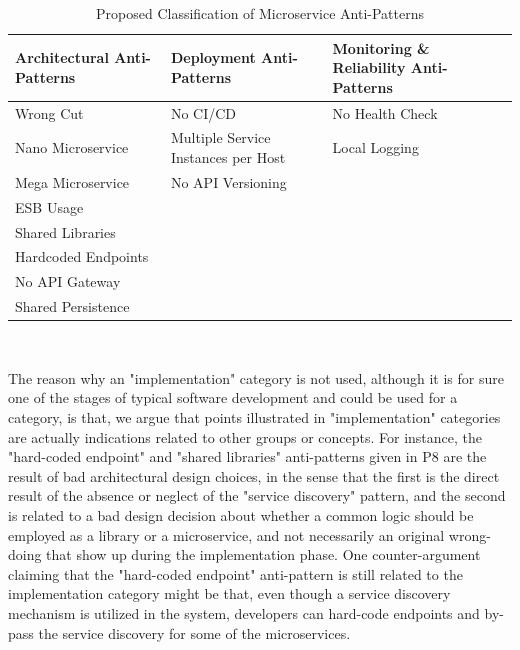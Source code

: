 \documentclass{Configuration_Files/PoliMi3i_thesis}
\begin{document}
\begin{table}[H]
\centering 
    \begin{tabular}{ 
  | >{\centering\arraybackslash} m{12em} 
  | >{\centering\arraybackslash} m{12em} 
  | >{\centering\arraybackslash} m{12em} | }
    \hline
    \rowcolor{bluepoli!40}
    \textbf{Architectural Anti-Patterns} & \textbf{Deployment Anti-Patterns} & \textbf{Monitoring \& Reliability Anti-Patterns}\T\B \\
    \hline \hline
    Wrong Cut & No CI/CD & No Health Check\T\B\\
    \hline
    \rowcolor{bluepoli!10}
    Nano Microservice & Multiple Service Instances per Host & Local Logging\T\B\\
    \hline
    Mega Microservice & No API Versioning & \T\B\\
    \hline
    \rowcolor{bluepoli!10}
    ESB Usage &  & \T\B\\
    \hline
    Shared Libraries &  & \T\B\\
    \hline
    \rowcolor{bluepoli!10}
    Hardcoded Endpoints & & \T\B\\
    \hline
    No API Gateway & & \T\B\\
    \hline
    \rowcolor{bluepoli!10}
    Shared Persistence & & \T\B\\
    \hline
    \end{tabular}
    \\[10pt]
    \caption{Proposed Classification of Microservice Anti-Patterns}
    \label{table:antipattern_table}
\end{table}
The reason why an "implementation" category is not used, although it is for sure one of the stages of typical software development and could be used for a category, is that, we argue that points illustrated in "implementation" categories are actually indications related to other groups or concepts.
For instance, the "hard-coded endpoint" and "shared libraries" anti-patterns given in P8 are the result of bad architectural design choices, in the sense that the first is the direct result of the absence or neglect of the "service discovery" pattern, and the second is related to a bad design decision about whether a common logic should be employed as a library or a microservice, and not necessarily an original wrong-doing that show up during the implementation phase.
One counter-argument claiming that the "hard-coded endpoint" anti-pattern is still related to the implementation category might be that, even though a service discovery mechanism is utilized in the system, developers can hard-code endpoints and by-pass the service discovery for some of the microservices.
\end{document}
